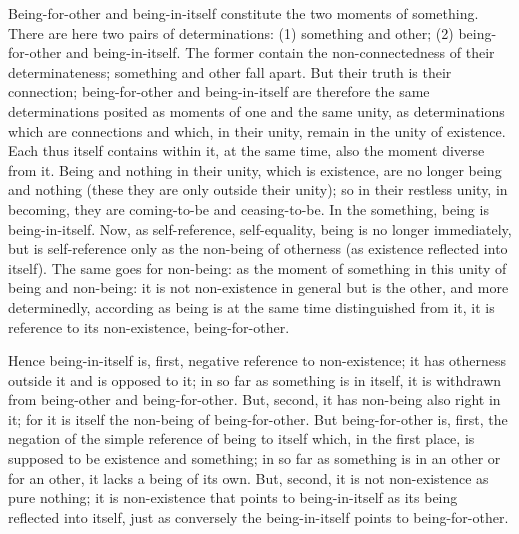 Being-for-other and being-in-itself constitute
the two moments of something.
There are here two pairs of determinations:
(1) something and other;
(2) being-for-other and being-in-itself.
The former contain the non-connectedness of their determinateness;
something and other fall apart.
But their truth is their connection;
being-for-other and being-in-itself are
therefore the same determinations posited as
moments of one and the same unity,
as determinations which are connections
and which, in their unity,
remain in the unity of existence.
Each thus itself contains within it, at the same time,
also the moment diverse from it.
Being and nothing in their unity, which is existence,
are no longer being and nothing
(these they are only outside their unity);
so in their restless unity, in becoming,
they are coming-to-be and ceasing-to-be.
In the something, being is being-in-itself.
Now, as self-reference, self-equality,
being is no longer immediately,
but is self-reference only as the non-being of otherness
(as existence reflected into itself).
The same goes for non-being:
as the moment of something in this
unity of being and non-being:
it is not non-existence in general
but is the other, and more determinedly,
according as being is at the same time distinguished from it,
it is reference to its non-existence, being-for-other.

Hence being-in-itself is, first,
negative reference to non-existence;
it has otherness outside it and is opposed to it;
in so far as something is in itself,
it is withdrawn from being-other and being-for-other.
But, second, it has non-being also right in it;
for it is itself the non-being of being-for-other.
But being-for-other is, first, the negation of
the simple reference of being to itself
which, in the first place, is supposed
to be existence and something;
in so far as something is in an other or for an other,
it lacks a being of its own.
But, second, it is not non-existence as pure nothing;
it is non-existence that points to being-in-itself
as its being reflected into itself,
just as conversely the being-in-itself points to being-for-other.

